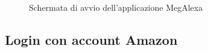 \begin{figure}[H]
	\centering
	\caption{Schermata di avvio dell'applicazione MegAlexa}
\end{figure}
\newpage
\subsection{Login con account Amazon}

